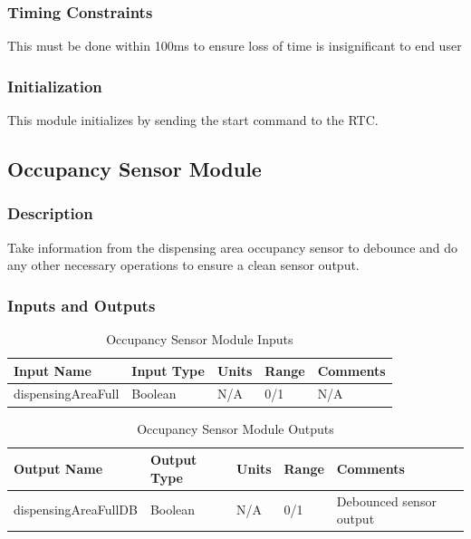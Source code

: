 \documentclass[12pt,titlepage]{article}
\begin{document}
\subsubsection*{Timing Constraints}
This must be done within 100ms to ensure loss of time is insignificant to end user
\subsubsection*{Initialization}
This module initializes by sending the start command to the RTC. 

\subsection{Occupancy Sensor Module}
\subsubsection*{Description}
Take information from the dispensing area occupancy sensor to debounce and do any other necessary operations to ensure a clean sensor output. 
\subsubsection*{Inputs and Outputs}

\begin{table}[ht!]
\begin{center}
\begin{adjustbox}{max width=\textwidth}
\small
\begin{tabular}{|p{}|p{}|p{}|p{}|p{}|}
 \hline
 \textbf{Input Name} & \textbf{Input Type} & \textbf{Units} &\textbf{Range} & \textbf{Comments} \\
 \hline 
 dispensingAreaFull & Boolean  & N/A & 0/1 & N/A \\
 \hline
\end{tabular}
\end{adjustbox}
\end{center}
\caption{Occupancy Sensor Module Inputs}
\end{table}

\begin{table}[ht!]
\begin{center}
\begin{adjustbox}{max width=\textwidth}
\small
\begin{tabular}{|p{}|p{}|p{}|p{}|p{}|}
 \hline
 \textbf{Output Name} & \textbf{Output Type} & \textbf{Units} &\textbf{Range} & \textbf{Comments} \\
 \hline 
 dispensingAreaFullDB & Boolean & N/A & 0/1 & Debounced sensor output \\
 \hline
\end{tabular}
\end{adjustbox}
\end{center}
\caption{Occupancy Sensor Module Outputs}
\end{table}
\end{document}
